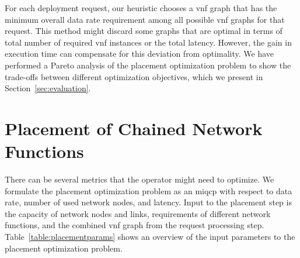 \documentclass[10pt,a4paper,conference]{IEEEtran}
\begin{document}
For each deployment request, our heuristic chooses a \ac{vnf} graph that has the 
minimum overall data rate requirement among all possible \ac{vnf} graphs for that
request.
This method might discard some graphs that are optimal 
in terms of total number of required \ac{vnf} instances or the total latency. However,
the gain in execution time can compensate for this deviation from optimality.
We have performed a Pareto analysis of the placement optimization problem to show
the trade-offs between different optimization objectives, which we present in 
Section~\ref{sec:evaluation}.

\section{Placement of Chained Network Functions}
\label{sec:placement}

There can be several
metrics that the operator might need to optimize. We formulate the placement
optimization problem as an \ac{miqcp} with respect to data rate, number 
of used network nodes, and latency. Input to the placement step is the capacity
of network nodes and links, requirements of different network functions, and the
combined \ac{vnf} graph from the request processing step. Table~\ref{table:placementparams}
shows an overview of the input parameters to the placement optimization problem.
\end{document}
